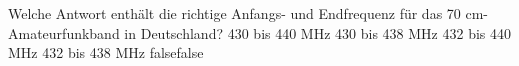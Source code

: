     {Welche Antwort enthält die richtige Anfangs- und Endfrequenz für das 70 cm-Amateurfunkband in Deutschland? }
    {430 bis 440 MHz}
    {430 bis 438 MHz}
    {432 bis 440 MHz}
    {432 bis 438 MHz}
    {false}{false}